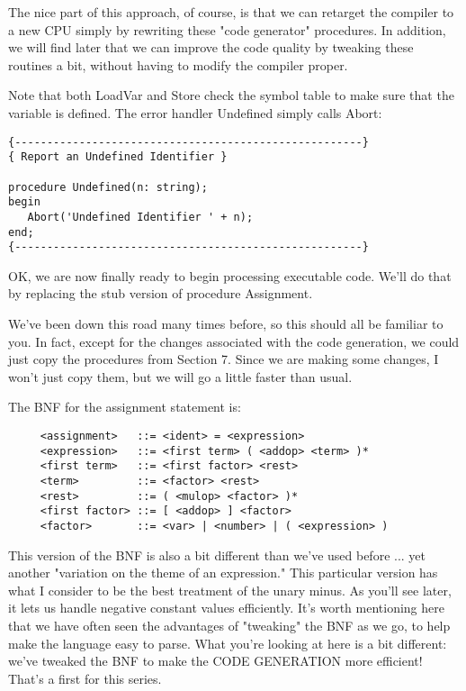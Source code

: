 The  nice  part  of  this  approach, of  course, is that we can retarget  the compiler to a new CPU  simply  by  rewriting  these "code generator" procedures. In  addition, we  will  find later that we can improve the code quality by tweaking these routines a bit, without having to modify the compiler proper.

Note that both LoadVar  and  Store check the symbol table to make sure that the variable is defined. The  error  handler Undefined simply calls Abort:

\begin{verbatim}
{------------------------------------------------------}
{ Report an Undefined Identifier }

procedure Undefined(n: string);
begin
   Abort('Undefined Identifier ' + n);
end;
{------------------------------------------------------}
\end{verbatim}

OK, we are now finally ready to begin processing executable code. We'll  do  that  by  replacing  the  stub  version  of  procedure Assignment.

We've been down this  road  many times before, so this should all be familiar to you. In fact, except for the changes associated with the code generation, we  could just copy the procedures from Section 7. Since we are making some changes, I won't just copy them, but we will go a little faster than usual.

The BNF for the assignment statement is:

\begin{verbatim}
     <assignment>   ::= <ident> = <expression>
     <expression>   ::= <first term> ( <addop> <term> )*
     <first term>   ::= <first factor> <rest>
     <term>         ::= <factor> <rest>
     <rest>         ::= ( <mulop> <factor> )*
     <first factor> ::= [ <addop> ] <factor>
     <factor>       ::= <var> | <number> | ( <expression> )
\end{verbatim}

This version of the BNF is  also  a bit different than we've used before ... yet another "variation on the theme of an expression." This particular version  has  what  I  consider  to  be  the best treatment  of  the  unary minus. As you'll see later, it lets us handle   negative  constant  values  efficiently. It's   worth mentioning  here  that  we  have  often  seen  the advantages  of "tweaking"  the  BNF  as we go, to help make the language easy to parse. What  you're looking at here is a bit different:  we've tweaked  the  BNF  to make the CODE  GENERATION  more  efficient!  That's a first for this series.

